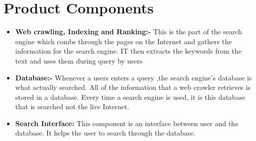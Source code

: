 \documentclass{scrreprt}
\begin{document}
\section{Product Components}

\begin{itemize}
    \item \textbf{Web crawling, Indexing and Ranking:-} This is the part of the search engine which combs through the pages on the Internet and gathers the information for the search engine. IT then extracts the keywords from the text and uses them during query by users
    \item \textbf{Database:-} Whenever a users enters a query ,the search engine’s database is what actually searched. All of the information that a web crawler retrieves is stored in a database. Every time a search engine is used, it is this database that is searched not the live Internet.
    \item \textbf{Search Interface:} This component is an interface between user and the database. It helps the user to search through the database.
  
\end{itemize}
 
 
\end{document}

